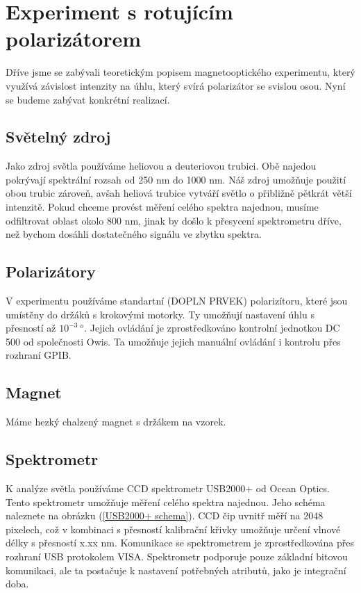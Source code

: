 \documentclass[a4paper,12pt]{article}
\begin{document}
\section{Experiment s rotujícím polarizátorem}
Dříve jsme se zabývali teoretickým popisem magnetooptického experimentu, který využívá závislost intenzity na úhlu, který svírá polarizátor se svislou osou. Nyní se budeme zabývat konkrétní realizací.
\subsection{Světelný zdroj}
Jako zdroj světla používáme heliovou a deuteriovou trubici. Obě najedou pokrývají spektrální rozsah od 250 nm do 1000 nm. Náš zdroj umožňuje použití obou trubic zároveň, avšah heliová trubice vytváří světlo o přibližně pětkrát větší intenzitě. Pokud chceme provést měření celého spektra najednou, musíme odfiltrovat oblast okolo 800 nm, jinak by došlo k přesycení spektrometru dříve, než bychom dosáhli dostatečného signálu ve zbytku spektra.

\subsection{Polarizátory}
V experimentu používáme standartní (DOPLN PRVEK) polarizítoru, které jsou umístěny do držáků s krokovými motorky.  Ty umožňují nastavení úhlu s přesností až $10^{-3}\ ^o$. Jejich ovládání je zprostředkováno kontrolní jednotkou DC 500 od společnosti Owis. Ta umožňuje jejich manuální ovládání i kontrolu přes rozhraní GPIB.

\subsection{Magnet}
Máme hezký chalzený magnet s držákem na vzorek.

\subsection{Spektrometr}
K analýze světla používáme CCD spektrometr USB2000+ od Ocean Optics. Tento spektrometr umožňuje měření celého spektra najednou. Jeho schéma naleznete na obrázku (\ref{USB2000+ schema}). CCD čip uvnitř měří na 2048 pixelech, což v kombinaci s přesností kalibrační křivky umožňuje určení vlnové délky s přesností x.xx nm. Komunikace se spektrometrem je zprostředkována přes rozhraní USB protokolem VISA. Spektrometr podporuje pouze základní bitovou komunikaci, ale ta postačuje k nastavení potřebných atributů, jako je integrační doba.
\end{document}
